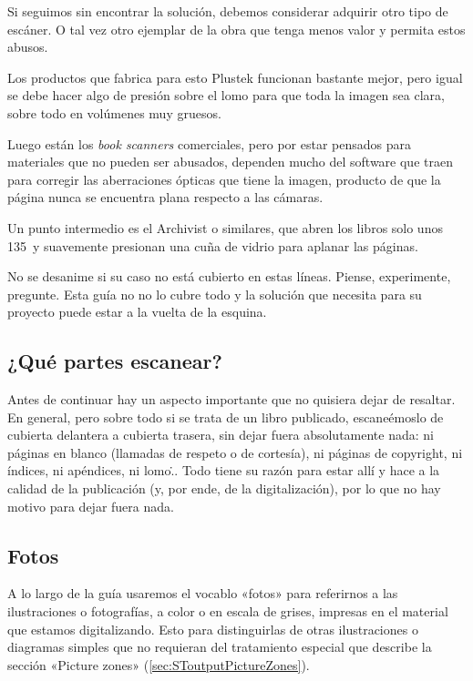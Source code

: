 \documentclass[%
	a5paper,
	10pt,
	twoside,
	openright,
	final,
]{memoir}
\begin{document}
	Si seguimos sin encontrar la solución, debemos considerar adquirir otro tipo de escáner. O tal vez otro ejemplar de la obra que tenga menos valor y permita estos abusos.

	Los productos que fabrica para esto Plustek funcionan bastante mejor, pero igual se debe hacer algo de presión sobre el lomo para que toda la imagen sea clara, sobre todo en volúmenes muy gruesos.

	Luego están los \emph{book scanners} comerciales, pero por estar pensados para materiales que no pueden ser abusados, dependen mucho del software que traen para corregir las aberraciones ópticas que tiene la imagen, producto de que la página nunca se encuentra plana respecto a las cámaras.

	Un punto intermedio es el Archivist o similares, que abren los libros solo unos 135\textdegree\ y suavemente presionan una cuña de vidrio para aplanar las páginas.

	No se desanime si su caso no está cubierto en estas líneas. Piense, experimente, pregunte. Esta guía no no lo cubre todo y la solución que necesita para su proyecto puede estar a la vuelta de la esquina.

	\subsection{¿Qué partes escanear?\label{sec:scanningWhatToScan}} Antes de continuar hay un aspecto importante que no quisiera dejar de resaltar. En general, pero sobre todo si se trata de un libro publicado, escaneémoslo de cubierta delantera a cubierta trasera, sin dejar fuera absolutamente nada: ni páginas en blanco (llamadas de respeto o de cortesía), ni páginas de copyright, ni índices, ni apéndices, ni lomo\... Todo tiene su razón para estar allí y hace a la calidad de la publicación (y, por ende, de la digitalización), por lo que no hay motivo para dejar fuera nada.

	\subsection{Fotos\label{sec:scanningPhotos}} A lo largo de la guía usaremos el vocablo «fotos» para referirnos a las ilustraciones o fotografías, a color o en escala de grises, impresas en el material que estamos digitalizando. Esto para distinguirlas de otras ilustraciones o diagramas simples que no requieran del tratamiento especial que describe la sección «Picture zones» (\ref{sec:SToutputPictureZones}).
\end{document}
